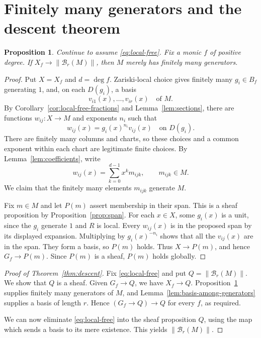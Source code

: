 \documentclass[11pt]{amsart}
\newtheorem{proposition}[theorem]{Proposition}
\theoremstyle{definition}
\newcommand{\Bas}{\mathcal B}
\newcommand{\tr}[1]{\lVert #1\rVert}
\begin{document}
\section{Finitely many generators and the descent theorem}

\begin{proposition}\label{prop:generators}
Continue to assume \eqref{eq:local-free}. Fix a monic $f$ of positive
degree. If $X_f\to\tr{\Bas_r(M)}$, then $M$ merely has finitely many
generators.
\end{proposition}
\begin{proof}
Put $X=X_f$ and $d=\deg f$. Zariski-local choice gives finitely many
$g_i\in B_f$ generating $1$, and, on each $D(g_i)$, a basis
\[
 v_{i1}(x),\ldots,v_{ir}(x)\quad\text{of }M.
\]
By Corollary~\ref{cor:local-free-fractions} and
Lemma~\ref{lem:sections}, there are functions $w_{ij}:X\to M$ and
exponents $n_i$ such that
\[
 w_{ij}(x)=g_i(x)^{n_i}v_{ij}(x)\quad\text{on }D(g_i).
\]
There are finitely many columns and charts, so these choices and a common
exponent within each chart are legitimate finite choices.
By Lemma~\ref{lem:coefficients}, write
\[
 w_{ij}(x)=\sum_{k=0}^{d-1}x^k m_{ijk},\qquad m_{ijk}\in M.
\]
We claim that the finitely many elements $m_{ijk}$ generate $M$.

Fix $m\in M$ and let $P(m)$ assert membership in their span. This is a
sheaf proposition by Proposition~\ref{prop:span}. For each $x\in X$,
some $g_i(x)$ is a unit, since the $g_i$ generate $1$ and $R$ is local.
Every $w_{ij}(x)$ is in the proposed span by its displayed expansion.
Multiplying by $g_i(x)^{-n_i}$ shows that all the $v_{ij}(x)$ are in the
span. They form a basis, so $P(m)$ holds. Thus $X\to P(m)$, and hence
$G_f\to P(m)$. Since $P(m)$ is a sheaf, $P(m)$ holds globally.
\end{proof}

\begin{proof}[Proof of Theorem~\ref{thm:descent}]
Fix \eqref{eq:local-free} and put $Q=\tr{\Bas_r(M)}$.
We show that $Q$ is a sheaf. Given $G_f\to Q$, we have $X_f\to Q$.
Proposition~\ref{prop:generators} supplies finitely many generators of
$M$, and Lemma~\ref{lem:basis-among-generators} supplies a basis of
length $r$. Hence $(G_f\to Q)\to Q$ for every $f$, as required.

We can now eliminate \eqref{eq:local-free} into the sheaf proposition
$Q$, using the map which sends a basis to its mere existence.
This yields $\tr{\Bas_r(M)}$.
\end{proof}
\end{document}
